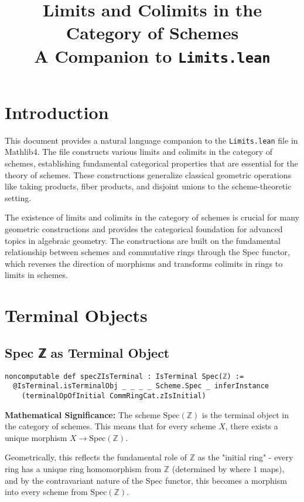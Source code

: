 \documentclass{article}
\title{Limits and Colimits in the Category of Schemes\\
\large A Companion to \texttt{Limits.lean}}
\author{}
\date{}
\theoremstyle{definition}
\begin{document}
\maketitle

\section{Introduction}

This document provides a natural language companion to the \texttt{Limits.lean} file in Mathlib4. The file constructs various limits and colimits in the category of schemes, establishing fundamental categorical properties that are essential for the theory of schemes. These constructions generalize classical geometric operations like taking products, fiber products, and disjoint unions to the scheme-theoretic setting.

The existence of limits and colimits in the category of schemes is crucial for many geometric constructions and provides the categorical foundation for advanced topics in algebraic geometry. The constructions are built on the fundamental relationship between schemes and commutative rings through the Spec functor, which reverses the direction of morphisms and transforms colimits in rings to limits in schemes.

\section{Terminal Objects}

\subsection{Spec ℤ as Terminal Object}

\begin{lstlisting}
noncomputable def specZIsTerminal : IsTerminal Spec(ℤ) :=
  @IsTerminal.isTerminalObj _ _ _ _ Scheme.Spec _ inferInstance
    (terminalOpOfInitial CommRingCat.zIsInitial)
\end{lstlisting}

\textbf{Mathematical Significance:} The scheme $\mathrm{Spec}(\mathbb{Z})$ is the terminal object in the category of schemes. This means that for every scheme $X$, there exists a unique morphism $X \to \mathrm{Spec}(\mathbb{Z})$.

Geometrically, this reflects the fundamental role of $\mathbb{Z}$ as the "initial ring" - every ring has a unique ring homomorphism from $\mathbb{Z}$ (determined by where $1$ maps), and by the contravariant nature of the Spec functor, this becomes a morphism into every scheme from $\mathrm{Spec}(\mathbb{Z})$.
\end{document}
